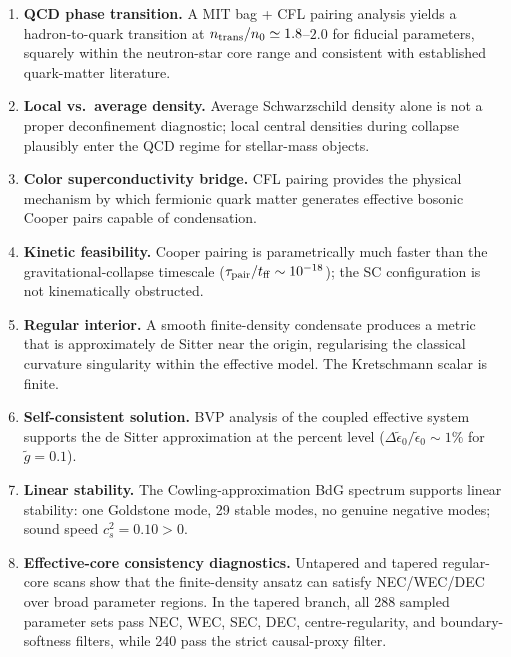 \documentclass[epj]{svjour}
\begin{document}
\begin{enumerate}
\item \textbf{QCD phase transition.} A MIT bag + CFL pairing analysis yields a hadron-to-quark transition at $n_{\rm trans}/n_0 \simeq 1.8$--$2.0$ for fiducial parameters, squarely within the neutron-star core range and consistent with established quark-matter literature.

\item \textbf{Local vs.\ average density.} Average Schwarzschild density alone is not a proper deconfinement diagnostic; local central densities during collapse plausibly enter the QCD regime for stellar-mass objects.

\item \textbf{Color superconductivity bridge.} CFL pairing provides the physical mechanism by which fermionic quark matter generates effective bosonic Cooper pairs capable of condensation.

\item \textbf{Kinetic feasibility.} Cooper pairing is parametrically much faster than the gravitational-collapse timescale ($\tau_{\rm pair}/t_{\rm ff} \sim 10^{-18}$); the SC configuration is not kinematically obstructed.

\item \textbf{Regular interior.} A smooth finite-density condensate produces a metric that is approximately de Sitter near the origin, regularising the classical curvature singularity within the effective model. The Kretschmann scalar is finite.

\item \textbf{Self-consistent solution.} BVP analysis of the coupled effective system supports the de Sitter approximation at the percent level ($\Delta\tilde{\epsilon}_0/\tilde{\epsilon}_0 \sim 1\%$ for $\tilde{g}=0.1$).

\item \textbf{Linear stability.} The Cowling-approximation BdG spectrum supports linear stability: one Goldstone mode, 29 stable modes, no genuine negative modes; sound speed $c_s^2 = 0.10 > 0$.


\item \textbf{Effective-core consistency diagnostics.} Untapered and tapered regular-core scans show that the finite-density ansatz can satisfy NEC/WEC/DEC over broad parameter regions. In the tapered branch, all 288 sampled parameter sets pass NEC, WEC, SEC, DEC, centre-regularity, and boundary-softness filters, while 240 pass the strict causal-proxy filter.


\end{enumerate}
\end{document}
